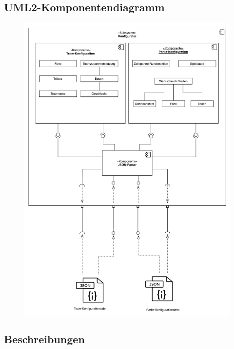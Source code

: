 \subsection{UML2-Komponentendiagramm}

\begin{figure}[H]
    \centering
    \includegraphics[scale=0.6]{images/Leveleditor.pdf}
\end{figure}

\subsection{Beschreibungen}

